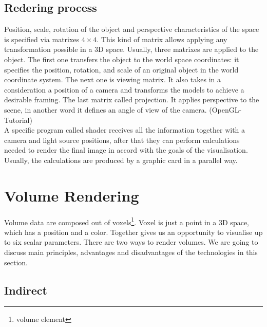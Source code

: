 \documentclass[twoside, english, 11pt]{report}
\begin{document}
\subsection{Redering process}
Position, scale, rotation of the object and perspective characteristics of the space is specified via matrixes $4\times4$. This kind of matrix allows applying any transformation possible in a 3D space. Usually, three matrixes are applied to the object. The first one transfers the object to the world space coordinates: it specifies the position, rotation, and scale of an original object in the world coordinate system. The next one is viewing matrix. It also takes in a consideration a position of a camera and transforms the models to achieve a desirable framing. The last matrix called projection. It applies perspective to the scene, in another word it defines an angle of view of the camera. (OpenGL-Tutorial)\\

A specific program called shader receives all the information together with a camera and light source positions, after that they can perform calculations needed to render the final image in accord with the goals of the visualisation. Usually, the calculations are produced by a graphic card in a parallel way.

\section{Volume Rendering}

Volume data are composed out of voxels\footnote{volume element}. Voxel is just a point in a 3D space, which has a position and a color. Together gives us an opportunity to visualise up to six scalar parameters. There are two ways to render volumes. We are going to discuss main principles, advantages and disadvantages of the technologies in this section.\\

\subsection{Indirect}
\end{document}

